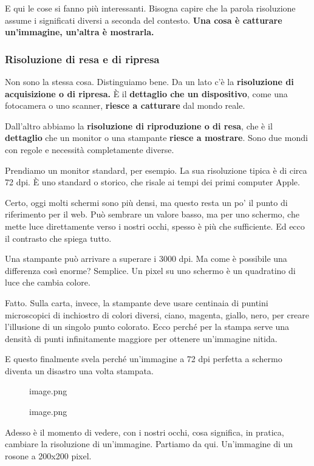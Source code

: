 \documentclass[
]{article}
\begin{document}
E qui le cose si fanno più interessanti. Bisogna capire che la parola risoluzione assume i significati diversi a seconda del contesto. \textbf{Una cosa è catturare un'immagine, un'altra è mostrarla.}

\hypertarget{risoluzione-di-resa-e-di-ripresa}{%
\subsubsection{Risoluzione di resa e di ripresa}\label{risoluzione-di-resa-e-di-ripresa}}

Non sono la stessa cosa. Distinguiamo bene. Da un lato c'è la \textbf{risoluzione di acquisizione o di ripresa.}
È il \textbf{dettaglio che un dispositivo}, come una fotocamera o uno scanner, \textbf{riesce a catturare} dal mondo reale.

Dall'altro abbiamo la \textbf{risoluzione di riproduzione o di resa}, che è il \textbf{dettaglio} che un monitor o una stampante \textbf{riesce a mostrare}. Sono due mondi con regole e necessità completamente diverse.

Prendiamo un monitor standard, per esempio. La sua risoluzione tipica è di circa 72 dpi. È uno standard o storico, che risale ai tempi dei primi computer Apple.

Certo, oggi molti schermi sono più densi, ma questo resta un po' il punto di riferimento per il web. Può sembrare un valore basso, ma per uno schermo, che mette luce direttamente verso i nostri occhi, spesso è più che sufficiente. Ed ecco il contrasto che spiega tutto.

Una stampante può arrivare a superare i 3000 dpi. Ma come è possibile una differenza così enorme? Semplice. Un pixel su uno schermo è un quadratino di luce che cambia colore.

Fatto. Sulla carta, invece, la stampante deve usare centinaia di puntini microscopici di inchiostro di colori diversi, ciano, magenta, giallo, nero, per creare l'illusione di un singolo punto colorato. Ecco perché per la stampa serve una densità di punti infinitamente maggiore per ottenere un'immagine nitida.

E questo finalmente svela perché un'immagine a 72 dpi perfetta a schermo diventa un disastro una volta stampata.

\begin{figure}
\centering
{image.png}
\caption{image.png}
\end{figure}

Adesso è il momento di vedere, con i nostri occhi, cosa significa, in pratica, cambiare la risoluzione di un'immagine. Partiamo da qui. Un'immagine di un rosone a 200x200 pixel.
\end{document}
